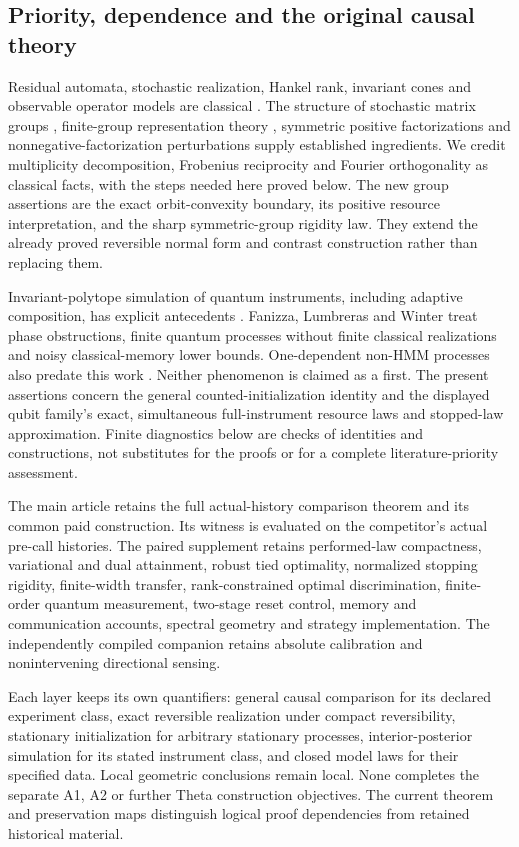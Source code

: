 \subsection*{Priority, dependence and the original causal theory}
Residual automata, stochastic realization, Hankel rank, invariant cones and
observable operator models are classical
\cite{RabinScott59,Heller65,CarlylePaz71,Jaeger00,ThonJaeger15,MonrasWinter14}.
The structure of stochastic matrix groups
\cite{Schwarz64,Flor69,Brown64,Schwarz62}, finite-group representation theory
\cite{Serre77}, symmetric positive factorizations
\cite{GPT13,KPT10} and nonnegative-factorization perturbations
\cite{BocciCarliniRapallo11,GillisGlineur12} supply established ingredients.
We credit multiplicity decomposition, Frobenius reciprocity and Fourier
orthogonality as classical facts, with the steps needed here proved below.
The new group assertions are the exact orbit-convexity boundary, its
positive resource interpretation, and the sharp symmetric-group rigidity
law. They extend the already proved reversible normal form and contrast
construction rather than replacing them.

Invariant-polytope simulation of quantum instruments, including adaptive
composition, has explicit antecedents \cite{MonrasWinter14,Okay26}.
Fanizza, Lumbreras and Winter \cite{Fanizza24} treat phase obstructions,
finite quantum processes without finite classical realizations and noisy
classical-memory lower bounds. One-dependent non-HMM processes also
predate this work \cite{HolroydLiggett16}. Neither phenomenon is claimed
as a first. The present assertions concern the general counted-initialization
identity and the displayed qubit family's exact, simultaneous full-instrument
resource laws and stopped-law approximation. Finite diagnostics below are
checks of identities and constructions, not substitutes for the proofs or
for a complete literature-priority assessment.

The main article retains the full actual-history comparison theorem and
its common paid construction. Its witness is evaluated on the competitor's
actual pre-call histories. The paired supplement retains performed-law
compactness, variational and dual attainment, robust tied optimality,
normalized stopping rigidity, finite-width transfer, rank-constrained
optimal discrimination, finite-order quantum measurement, two-stage reset
control, memory and communication accounts, spectral geometry and strategy
implementation. The independently compiled companion retains absolute
calibration and nonintervening directional sensing.

Each layer keeps its own quantifiers: general causal comparison for its
declared experiment class, exact reversible realization under compact
reversibility, stationary initialization for arbitrary stationary processes,
interior-posterior simulation for its stated instrument class, and closed
model laws for their specified data. Local geometric conclusions remain
local. None completes the separate A1, A2 or further Theta construction
objectives. The current theorem and preservation maps distinguish logical
proof dependencies from retained historical material.
